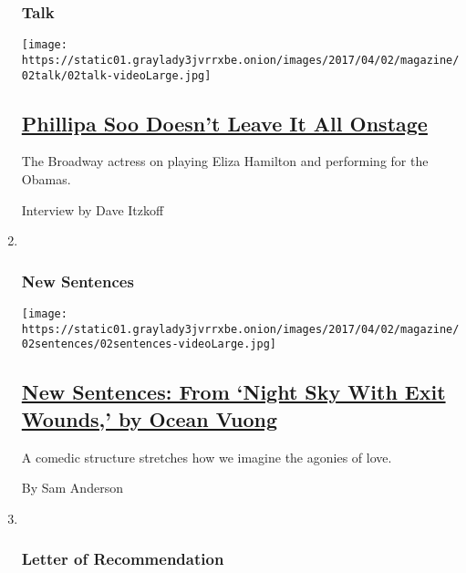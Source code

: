 \begin{enumerate}
{  \subsubsection{Talk}\label{talk}}

  \texttt{[image: https://static01.graylady3jvrrxbe.onion/images/2017/04/02/magazine/02talk/02talk-videoLarge.jpg]}

  \hypertarget{phillipa-soo-doesnt-leave-it-all-onstage}{%
  \subsection{\texorpdfstring{\href{/2017/03/29/magazine/phillipa-soo-doesnt-leave-it-all-onstage.html}{Phillipa
  Soo Doesn't Leave It All
  Onstage}}{Phillipa Soo Doesn't Leave It All Onstage}}\label{phillipa-soo-doesnt-leave-it-all-onstage}}

  The Broadway actress on playing Eliza Hamilton and performing for the
  Obamas.

  Interview by Dave Itzkoff
\item ~
  \hypertarget{new-sentences}{%
  \subsubsection{New Sentences}\label{new-sentences}}

  \texttt{[image: https://static01.graylady3jvrrxbe.onion/images/2017/04/02/magazine/02sentences/02sentences-videoLarge.jpg]}

  \hypertarget{new-sentences-from-night-sky-with-exit-wounds-by-ocean-vuong}{%
  \subsection{\texorpdfstring{\href{/2017/03/28/magazine/new-sentences-from-night-sky-with-exit-wounds-by-ocean-vuong.html}{New
  Sentences: From `Night Sky With Exit Wounds,' by Ocean
  Vuong}}{New Sentences: From `Night Sky With Exit Wounds,' by Ocean Vuong}}\label{new-sentences-from-night-sky-with-exit-wounds-by-ocean-vuong}}

  A comedic structure stretches how we imagine the agonies of love.

  By Sam Anderson
\item ~
  \hypertarget{letter-of-recommendation}{%
  \subsubsection{Letter of
  Recommendation}\label{letter-of-recommendation}}


\end{enumerate}
